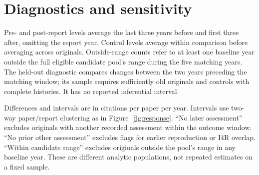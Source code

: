 \documentclass[11pt,letterpaper]{article}
\begin{document}
\section{Diagnostics and sensitivity}
\begin{table}[H]
\centering
\caption{Citation levels and comparison quality in the primary five-year matching sample.}
\label{tab:diagnostics}
\small

\par\smallskip\begin{minipage}{\linewidth}\footnotesize
Pre- and post-report levels average the last three years before and first three after, omitting the report year. Control levels average within comparison before averaging across originals. Outside-range counts refer to at least one baseline year outside the full eligible candidate pool's range during the five matching years. The held-out diagnostic compares changes between the two years preceding the matching window; its sample requires sufficiently old originals and controls with complete histories. It has no reported inferential interval.
\end{minipage}
\end{table}

\begin{table}[H]
\centering
\caption{Failed-minus-successful contrasts under sample restrictions.}
\label{tab:sensitivity}
\small

\par\smallskip\begin{minipage}{\linewidth}\footnotesize
Differences and intervals are in citations per paper per year. Intervals use two-way paper/report clustering as in Figure~\ref{fig:response}. ``No later assessment'' excludes originals with another recorded assessment within the outcome window. ``No prior other assessment'' excludes flags for earlier reproduction or I4R overlap. ``Within candidate range'' excludes originals outside the pool's range in any baseline year. These are different analytic populations, not repeated estimates on a fixed sample.
\end{minipage}
\end{table}
\clearpage

\end{document}
